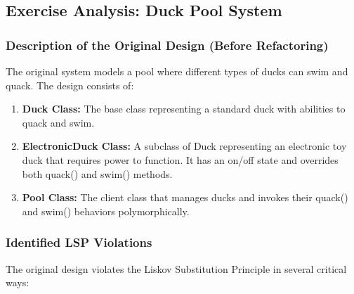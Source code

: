 \subsection{Exercise Analysis: Duck Pool System}

\subsubsection{Description of the Original Design (Before Refactoring)}

The original system models a pool where different types of ducks can swim and quack. The design consists of:

\begin{enumerate}
    \item \textbf{Duck Class:} The base class representing a standard duck with abilities to quack and swim.
    \item \textbf{ElectronicDuck Class:} A subclass of Duck representing an electronic toy duck that requires power to function. It has an on/off state and overrides both quack() and swim() methods.
    \item \textbf{Pool Class:} The client class that manages ducks and invokes their quack() and swim() behaviors polymorphically.
\end{enumerate}

\subsubsection{Identified LSP Violations}

The original design violates the Liskov Substitution Principle in several critical ways:

